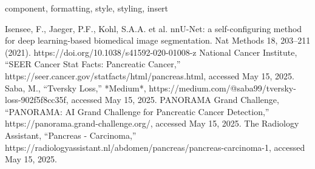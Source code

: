 \documentclass[conference]{IEEEtran}
\begin{document}
\begin{IEEEkeywords}
component, formatting, style, styling, insert
\end{IEEEkeywords}

\begin{thebibliography}{00}
 Isensee, F., Jaeger, P.F., Kohl, S.A.A. et al. nnU-Net: a self-configuring method for deep learning-based biomedical image segmentation. Nat Methods 18, 203–211 (2021). https://doi.org/10.1038/s41592-020-01008-z
 National Cancer Institute, ``SEER Cancer Stat Facts: Pancreatic Cancer,'' https://seer.cancer.gov/statfacts/html/pancreas.html, accessed May 15, 2025.
 Saba, M., ``Tversky Loss,'' *Medium*, https://medium.com/@saba99/tversky-loss-902f5f8cc35f, accessed May 15, 2025.
 PANORAMA Grand Challenge, ``PANORAMA: AI Grand Challenge for Pancreatic Cancer Detection,'' https://panorama.grand-challenge.org/, accessed May 15, 2025.
 The Radiology Assistant, ``Pancreas - Carcinoma,'' https://radiologyassistant.nl/abdomen/pancreas/pancreas-carcinoma-1, accessed May 15, 2025.




\end{thebibliography}
\end{document}
